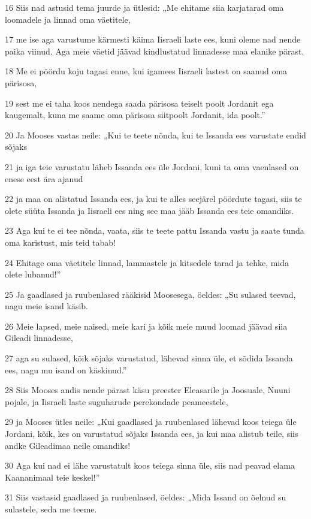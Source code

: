 \par 16 Siis nad astusid tema juurde ja ütlesid: „Me ehitame siia karjatarad oma loomadele ja linnad oma väetitele,
\par 17 me ise aga varustume kärmesti käima Iisraeli laste ees, kuni oleme nad nende paika viinud. Aga meie väetid jäävad kindlustatud linnadesse maa elanike pärast.
\par 18 Me ei pöördu koju tagasi enne, kui igamees Iisraeli lastest on saanud oma pärisosa,
\par 19 sest me ei taha koos nendega saada pärisosa teiselt poolt Jordanit ega kaugemalt, kuna me saame oma pärisosa siitpoolt Jordanit, ida poolt.”
\par 20 Ja Mooses vastas neile: „Kui te teete nõnda, kui te Issanda ees varustate endid sõjaks
\par 21 ja iga teie varustatu läheb Issanda ees üle Jordani, kuni ta oma vaenlased on enese eest ära ajanud
\par 22 ja maa on alistatud Issanda ees, ja kui te alles seejärel pöördute tagasi, siis te olete süüta Issanda ja Iisraeli ees ning see maa jääb Issanda ees teie omandiks.
\par 23 Aga kui te ei tee nõnda, vaata, siis te teete pattu Issanda vastu ja saate tunda oma karistust, mis teid tabab!
\par 24 Ehitage oma väetitele linnad, lammastele ja kitsedele tarad ja tehke, mida olete lubanud!”
\par 25 Ja gaadlased ja ruubenlased rääkisid Moosesega, öeldes: „Su sulased teevad, nagu meie isand käsib.
\par 26 Meie lapsed, meie naised, meie kari ja kõik meie muud loomad jäävad siia Gileadi linnadesse,
\par 27 aga su sulased, kõik sõjaks varustatud, lähevad sinna üle, et sõdida Issanda ees, nagu mu isand on käskinud.”
\par 28 Siis Mooses andis nende pärast käsu preester Eleasarile ja Joosuale, Nuuni pojale, ja Iisraeli laste suguharude perekondade peameestele,
\par 29 ja Mooses ütles neile: „Kui gaadlased ja ruubenlased lähevad koos teiega üle Jordani, kõik, kes on varustatud sõjaks Issanda ees, ja kui maa alistub teile, siis andke Gileadimaa neile omandiks!
\par 30 Aga kui nad ei lähe varustatult koos teiega sinna üle, siis nad peavad elama Kaananimaal teie keskel!”
\par 31 Siis vastasid gaadlased ja ruubenlased, öeldes: „Mida Issand on öelnud su sulastele, seda me teeme.
